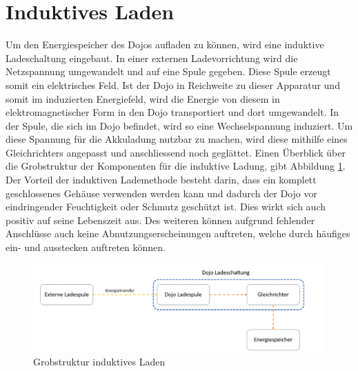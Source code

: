 \section{Induktives Laden}
Um den Energiespeicher des Dojos aufladen zu können, wird eine induktive Ladeschaltung eingebaut. In einer externen Ladevorrichtung wird die Netzspannung umgewandelt und auf eine Spule gegeben. Diese Spule erzeugt somit ein elektrisches Feld. Ist der Dojo in Reichweite zu dieser Apparatur und somit im induzierten Energiefeld, wird die Energie von diesem in elektromagnetischer Form in den Dojo transportiert und dort umgewandelt. In der Spule, die sich im Dojo befindet, wird so eine Wechselspannung induziert. Um diese Spannung für die Akkuladung nutzbar zu machen, wird diese mithilfe eines Gleichrichters angepasst und anschliessend noch geglättet. Einen Überblick über die Grobstruktur der Komponenten für die induktive Ladung, gibt Abbildung \ref{fig:Grobstruktur_ind_Laden}. Der Vorteil der induktiven Lademethode besteht darin, dass ein komplett geschlossenes Gehäuse verwenden werden kann und dadurch der Dojo vor eindringender Feuchtigkeit oder Schmutz geschützt ist. Dies wirkt sich auch positiv auf seine Lebenszeit aus. Des weiteren können aufgrund fehlender Anschlüsse auch keine Abnutzungserscheinungen auftreten, welche durch häufiges ein- und ausstecken auftreten können.

\begin{figure}[H]
\begin{center}
	\includegraphics[width=160mm]{data/Induktion.png}
	\caption{Grobstruktur induktives Laden} %
	\label{fig:Grobstruktur_ind_Laden}
\end{center}
\end{figure}
